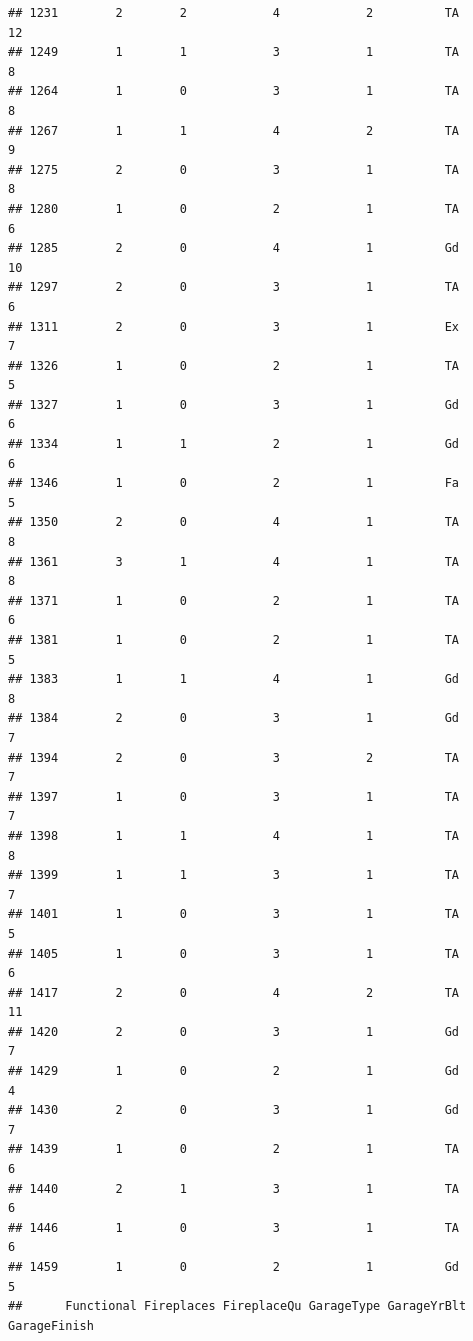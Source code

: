 \documentclass[]{article}
\begin{document}
\begin{verbatim}
## 1231        2        2            4            2          TA           12
## 1249        1        1            3            1          TA            8
## 1264        1        0            3            1          TA            8
## 1267        1        1            4            2          TA            9
## 1275        2        0            3            1          TA            8
## 1280        1        0            2            1          TA            6
## 1285        2        0            4            1          Gd           10
## 1297        2        0            3            1          TA            6
## 1311        2        0            3            1          Ex            7
## 1326        1        0            2            1          TA            5
## 1327        1        0            3            1          Gd            6
## 1334        1        1            2            1          Gd            6
## 1346        1        0            2            1          Fa            5
## 1350        2        0            4            1          TA            8
## 1361        3        1            4            1          TA            8
## 1371        1        0            2            1          TA            6
## 1381        1        0            2            1          TA            5
## 1383        1        1            4            1          Gd            8
## 1384        2        0            3            1          Gd            7
## 1394        2        0            3            2          TA            7
## 1397        1        0            3            1          TA            7
## 1398        1        1            4            1          TA            8
## 1399        1        1            3            1          TA            7
## 1401        1        0            3            1          TA            5
## 1405        1        0            3            1          TA            6
## 1417        2        0            4            2          TA           11
## 1420        2        0            3            1          Gd            7
## 1429        1        0            2            1          Gd            4
## 1430        2        0            3            1          Gd            7
## 1439        1        0            2            1          TA            6
## 1440        2        1            3            1          TA            6
## 1446        1        0            3            1          TA            6
## 1459        1        0            2            1          Gd            5
##      Functional Fireplaces FireplaceQu GarageType GarageYrBlt GarageFinish

\end{verbatim}
\end{document}
